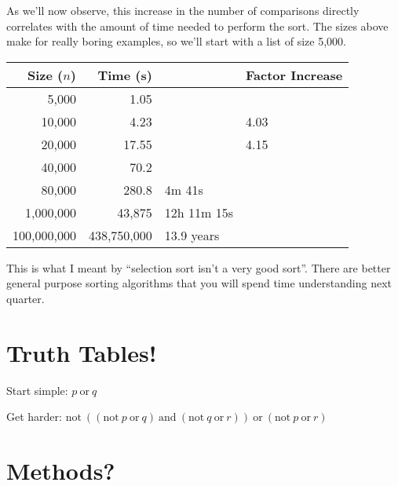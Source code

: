 \documentclass[12pt]{article}
\begin{document}
As we'll now observe, this increase in the number of comparisons directly
correlates with the amount of time needed to perform the sort.  The sizes above
make for really boring examples, so we'll start with a list of size 5,000.
\vspace{2ex}

\begin{tabular}{r r l l}
   Size ($n$) & Time (s) & & Factor Increase\\\midrule
   5,000 & 1.05 &\\
   10,000 & 4.23 & &4.03\\
   20,000 & 17.55 & &4.15\\
   40,000 & 70.2 &\\
   80,000 & 280.8 & 4m 41s\\
   1,000,000 & 43,875 & 12h 11m 15s\\
   100,000,000 & 438,750,000 & 13.9 years\\
\end{tabular}
\vspace{2ex}

This is what I meant by ``selection sort isn't a very good sort''.  There are
better general purpose sorting algorithms that you will spend time
understanding next quarter.

\section*{Truth Tables!}

Start simple: \(p\ \text{or}\ q\)

\noindent
Get harder: \(\text{not}\ ((\text{not}\ p\ \text{or}\ q)\ \text{and}\
(\text{not}\ q\ \text{or}\ r))\ \text{or}\ (\text{not}\ p\ \text{or}\ r)\)

\section*{Methods?}
\end{document}
